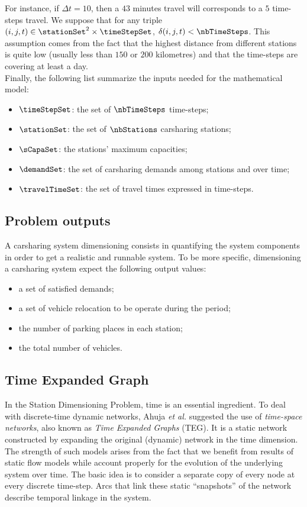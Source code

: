 \begin{bibunit}[ieeetr]
For instance, if $\Delta t = 10$, then a $43$ minutes travel will corresponds to a $5$ time-steps travel.
We suppose that for any triple $(i,j,t) \in \stationSet^2 \times \timeStepSet$, $\delta(i,j,t) < \nbTimeSteps$.
This assumption comes from the fact that the highest distance from different stations is quite low (usually less than $150$ or $200$ kilometres) and that the time-steps are covering at least a day.
~\\

Finally, the following list summarize the inputs needed for the mathematical model:
\begin{itemize}
\item $\timeStepSet$: the set of $\nbTimeSteps$ time-steps;
\item $\stationSet$: the set of $\nbStations$ carsharing stations;
\item $\sCapaSet$: the stations' maximum capacities;
\item $\demandSet$: the set of carsharing demands among stations and over time;
\item $\travelTimeSet$: the set of travel times expressed in time-steps.
\end{itemize}

\subsection{Problem outputs}

A carsharing system dimensioning consists in quantifying the system components in order to get a realistic and runnable system.
To be more specific, dimensioning a carsharing system expect the following output values:
\begin{itemize}
\item a set of satisfied demands;
\item a set of vehicle relocation to be operate during the period;
\item the number of parking places in each station;
\item the total number of vehicles.
\end{itemize}


\subsection{Time Expanded Graph}
In the Station Dimensioning Problem, time is an essential ingredient.
To deal with discrete-time dynamic networks, Ahuja {\em et al.} \cite{ahuja_network_1993} suggested the use of \emph{time-space networks}, also known as \emph{Time Expanded Graphs} (TEG). 
It is a static network constructed by expanding the original (dynamic) network in the time dimension.
The strength of such models arises from the fact that we benefit from results of static flow models while account properly for the evolution of the underlying system over time.
The basic idea is to consider a separate copy of every node at every discrete time-step. %
Arcs that link these static ``snapshots'' of the network describe temporal linkage in the system.


\end{bibunit}

